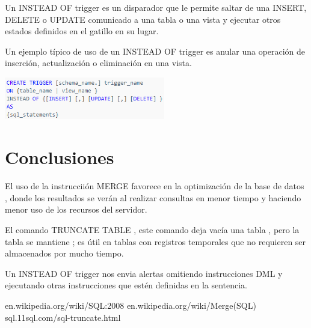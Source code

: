 \documentclass[twoside,twocolumn]{article}
\begin{document}
\begin{itemize}
Un INSTEAD OF trigger es un disparador que le permite saltar de una INSERT, DELETE o UPDATE comunicado a una tabla o una vista y ejecutar otros estados definidos en el gatillo en su lugar.

Un ejemplo típico de uso de un INSTEAD OF trigger es anular una operación de inserción, actualización o eliminación en una vista.

\begin{center}
\includegraphics[width=7cm]{./Imagenes/02} 
\end{center}

\end{itemize}
\section{Conclusiones}
El uso de la instrucciión MERGE favorece en la optimización de la base de datos , donde los resultados se verán al realizar consultas en menor tiempo y haciendo menor uso de los recursos del servidor.

El comando TRUNCATE TABLE , este comando deja vacía una tabla , pero la tabla se mantiene ; es útil en tablas con registros temporales que no requieren ser almacenados por mucho tiempo.

Un INSTEAD OF trigger nos envia alertas omitiendo instrucciones DML y ejecutando otras instrucciones que estén definidas en la sentencia.

\begin{thebibliography}{}
\bibitem {}
\newblock en.wikipedia.org/wiki/SQL:2008
\bibitem {}
\newblock en.wikipedia.org/wiki/Merge(SQL)
\bibitem {}
\newblock sql.11sql.com/sql-truncate.html
\end{thebibliography}
\end{document}
